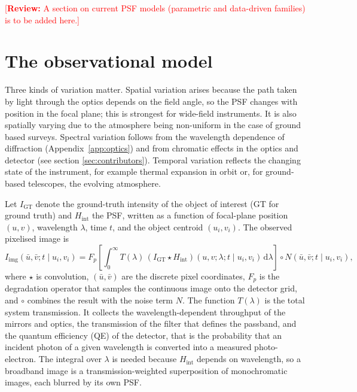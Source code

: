 \documentclass[11pt]{book}
\newcommand{\reviewnote}[1]{\textcolor{red}{[\textbf{Review:} #1]}}
\begin{document}
\reviewnote{A section on current PSF models (parametric and data-driven families) is to be added here.}

\section{The observational model}
\label{sec:obsmodel}

Three kinds of variation matter. Spatial variation arises because the path taken by light through the optics depends on the field angle, so the PSF changes with position in the focal plane; this is strongest for wide-field instruments. It is also spatially varying due to the atmosphere being non-uniform in the case of ground based surveys. Spectral variation follows from the wavelength dependence of diffraction (Appendix~\ref{app:optics}) and from chromatic effects in the optics and detector (see section \ref{sec:contributors}). Temporal variation reflects the changing state of the instrument, for example thermal expansion in orbit or, for ground-based telescopes, the evolving atmosphere.

Let $I_{\mathrm{GT}}$ denote the ground-truth intensity of the object of interest (GT for ground truth) and $H_{\mathrm{int}}$ the PSF, written as a function of focal-plane position $(u,v)$, wavelength $\lambda$, time $t$, and the object centroid $(u_i,v_i)$. The observed pixelised image is
\begin{equation}
I_{\mathrm{img}}(\bar u,\bar v;t\mid u_i,v_i)
= F_p\!\left[\int_0^{\infty} T(\lambda)\,(I_{\mathrm{GT}}\star H_{\mathrm{int}})(u,v;\lambda;t\mid u_i,v_i)\,\mathrm{d}\lambda\right]
\circ N(\bar u,\bar v;t\mid u_i,v_i),
\label{eq:obsmodel}
\end{equation}
where $\star$ is convolution, $(\bar u,\bar v)$ are the discrete pixel coordinates, $F_p$ is the degradation operator that samples the continuous image onto the detector grid, and $\circ$ combines the result with the noise term $N$. The function $T(\lambda)$ is the total system transmission. It collects the wavelength-dependent throughput of the mirrors and optics, the transmission of the filter that defines the passband, and the quantum efficiency (QE) of the detector, that is the probability that an incident photon of a given wavelength is converted into a measured photo-electron. The integral over $\lambda$ is needed because $H_{\mathrm{int}}$ depends on wavelength, so a broadband image is a transmission-weighted superposition of monochromatic images, each blurred by its own PSF.
\end{document}
